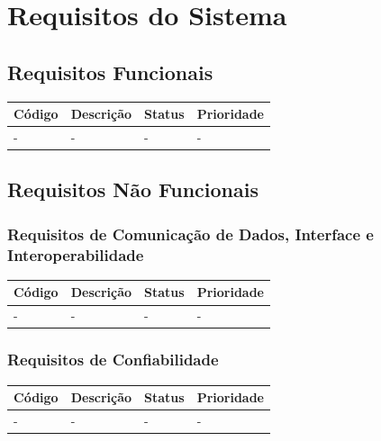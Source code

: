 \documentclass[a4paper, 12pt]{article}
\begin{document}
\section{Requisitos do Sistema}
\subsection{Requisitos Funcionais}
\begin{table}[ht]
	\centering
	
	\begin{tabular}{p{2cm}p{7cm}p{2cm}p{2cm}}
		\hline
		\cellcolor{gray}Código&\cellcolor{gray}Descrição&\cellcolor{gray}Status&\cellcolor{gray}Prioridade  \\
		\hline
		-&-&-&-\\
		\hline
	\end{tabular}
\end{table}%
\newpage
\subsection{Requisitos Não Funcionais}
\subsubsection{Requisitos de Comunicação de Dados, Interface e Interoperabilidade}
	\begin{table}[ht]
		\rowcolors{1}{}{}
		\centering
		
		\begin{tabular}{p{2cm}p{7cm}p{2cm}p{2cm}}
			\hline
			\cellcolor{gray}Código&\cellcolor{gray}Descrição&\cellcolor{gray}Status&\cellcolor{gray}Prioridade  \\
			\hline
			-&-&-&-\\
			\hline
		\end{tabular}
	\end{table}%
\subsubsection{Requisitos de Confiabilidade}
\begin{table}[ht]
	\centering
	
	\begin{tabular}{p{2cm}p{7cm}p{2cm}p{2cm}}
		\hline
		\cellcolor{gray}Código&\cellcolor{gray}Descrição&\cellcolor{gray}Status&\cellcolor{gray}Prioridade  \\
		\hline
		-&-&-&-\\
		\hline
	\end{tabular}
\end{table}%
\end{document}
